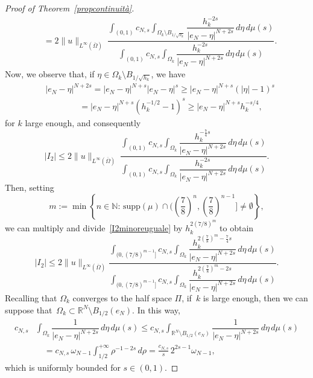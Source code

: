 \documentclass[10pt,a4paper]{amsart}
\def \N {\mathbb{N}}
\def \R {\mathbb{R}}
\renewcommand{\geq}{\geqslant}
\renewcommand{\leq}{\leqslant}
\begin{document}
\begin{proof}[Proof of Theorem~\ref{propcontinuità}]
\[\begin{aligned}
&=2\|u\|_{L^\infty(\overline{\Omega})} \ \dfrac{\displaystyle\int_{(0,1)}c_{N,s}\int_{\Omega_k\setminus B_{1/{\sqrt{h_k}}}}\dfrac{h_k^{-2s}}{|e_N-\eta|^{N+2s}}\,d\eta\,d\mu(s)}{\displaystyle\int_{(0,1)}c_{N,s}\int_{\Omega_k}\dfrac{h_k^{-2s}}{|e_N-\eta|^{N+2s}}\,d\eta\,d\mu(s)}.
\end{aligned}
\]
Now, we observe that, if 
$\eta \in \Omega_k\setminus B_{1/{\sqrt{h_k}}}$, we have
\[
\begin{aligned}&
|e_N-\eta|^{N+2s}=|e_N-\eta|^{N+s}|e_N-\eta|^s
\geq |e_N-\eta|^{N+s} (|\eta|-1)^s \\
&\qquad\qquad=|e_N-\eta|^{N+s} (h_k^{-1/2}-1)^s
\geq |e_N-\eta|^{N+s} h_k^{-s/4},
\end{aligned}
\]
for $k$ large enough, and consequently
\begin{equation}\label{I2minoreuguale}
|I_2|\leq 2\|u\|_{L^\infty(\overline{\Omega})} \ \dfrac{\displaystyle\int_{(0,1)}c_{N,s}\int_{\Omega_k}\dfrac{h_k^{-\frac{7}{4}s}}{|e_N-\eta|^{N+2s}}\,d\eta\,d\mu(s)}{\displaystyle\int_{(0,1)}c_{N,s}\int_{\Omega_k}\dfrac{h_k^{-2s}}{|e_N-\eta|^{N+2s}}\,d\eta\,d\mu(s)}.
\end{equation}
Then, setting
\begin{equation}\label{I2mMM}
m:=\min\left\{n\in \N:\, \mbox{supp}(\mu) \cap\Bigg(\left(\frac{7}{8}\right)^n,\left(\frac{7}{8}\right)^{n-1}\Bigg]\neq \emptyset\right\},
\end{equation}
we can multiply and divide~\eqref{I2minoreuguale} by $h_k^{2(7/8)^m}$ to obtain
\begin{equation}\label{I2minoreuguale7/8}
|I_2|\leq 2\|u\|_{L^\infty(\overline{\Omega})}
\dfrac{\displaystyle\int_{(0,(7/8)^{m-1}]}c_{N,s}\int_{\Omega_k}\dfrac{h_k^{2\left(\frac{7}{8}\right)^m-\frac{7}{4}s}}{|e_N-\eta|^{N+2s}}\,d\eta\,d\mu(s)}{\displaystyle\int_{(0,(7/8)^{m-1}]}c_{N,s}\int_{\Omega_k}\dfrac{h_k^{2\left(\frac{7}{8}\right)^m-2s}}{|e_N-\eta|^{N+2s}}\,d\eta\,d\mu(s)}.
\end{equation}
Recalling that $\Omega_k$ converges to the half space $\Pi$, if~$k$ is large enough, then we can suppose that~$\Omega_k \subset \R^N\setminus B_{1/2}(e_N)$. In this way, 
\[
\begin{aligned}
c_{N,s}&\int_{\Omega_k}\dfrac{1}{|e_N-\eta|^{N+2s}}\,d\eta\,d\mu(s)
\leq c_{N,s}\int_{\R^N\setminus B_{1/2}(e_N)}\dfrac{1}{|e_N-\eta|^{N+2s}}\,d\eta\,d\mu(s) \\
&\quad=c_{N,s} \,\omega_{N-1}\int_{1/2}^{+\infty}\rho^{-1-2s}\,d\rho
=\frac{c_{N,s}}{s}\,2^{2s-1}\omega_{N-1},
\end{aligned}
\]
which is uniformly bounded for $s\in (0,1)$. 


\end{proof}
\end{document}
